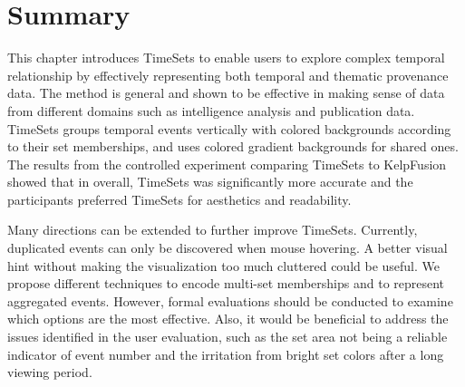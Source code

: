 \section{Summary}
This chapter introduces TimeSets to enable users to explore complex temporal relationship by effectively representing both temporal and thematic provenance data. The method is general and shown to be effective in making sense of data from different domains such as intelligence analysis and publication data. TimeSets groups temporal events vertically with colored backgrounds according to their set memberships, and uses colored gradient backgrounds for shared ones. The results from the controlled experiment comparing TimeSets to KelpFusion showed that in overall, TimeSets was significantly more accurate and the participants preferred TimeSets for aesthetics and readability.

Many directions can be extended to further improve TimeSets. Currently, duplicated events can only be discovered when mouse hovering. A better visual hint without making the visualization too much cluttered could be useful. We propose different techniques to encode multi-set memberships and to represent aggregated events. However, formal evaluations should be conducted to examine which options are the most effective. Also, it would be beneficial to address the issues identified in the user evaluation, such as the set area not being a reliable indicator of event number and the irritation from bright set colors after a long viewing period. 